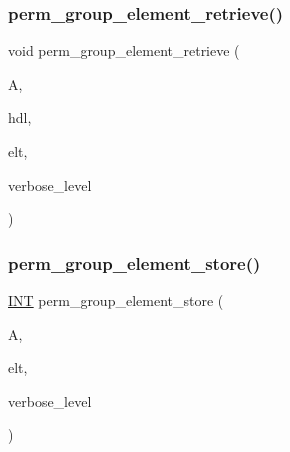 \subsubsection{\texorpdfstring{perm\+\_\+group\+\_\+element\+\_\+retrieve()}{perm\_group\_element\_retrieve()}}
{\footnotesize\ttfamily void perm\+\_\+group\+\_\+element\+\_\+retrieve (\begin{DoxyParamCaption}\item[{\mbox{\hyperlink{classaction}{action}} \&}]{A,  }\item[{\mbox{\hyperlink{galois_8h_a09fddde158a3a20bd2dcadb609de11dc}{I\+NT}}}]{hdl,  }\item[{void $\ast$}]{elt,  }\item[{\mbox{\hyperlink{galois_8h_a09fddde158a3a20bd2dcadb609de11dc}{I\+NT}}}]{verbose\+\_\+level }\end{DoxyParamCaption})}

\mbox{\label{interface__perm__group_8_c_a952bca01116a86ba8c2886b67d414784}} 
\subsubsection{\texorpdfstring{perm\+\_\+group\+\_\+element\+\_\+store()}{perm\_group\_element\_store()}}
{\footnotesize\ttfamily \mbox{\hyperlink{galois_8h_a09fddde158a3a20bd2dcadb609de11dc}{I\+NT}} perm\+\_\+group\+\_\+element\+\_\+store (\begin{DoxyParamCaption}\item[{\mbox{\hyperlink{classaction}{action}} \&}]{A,  }\item[{void $\ast$}]{elt,  }\item[{\mbox{\hyperlink{galois_8h_a09fddde158a3a20bd2dcadb609de11dc}{I\+NT}}}]{verbose\+\_\+level }\end{DoxyParamCaption})}

\mbox{\label{interface__perm__group_8_c_a71b6c0fd24b3d4880ec2f1c0f4ed5677}} 

